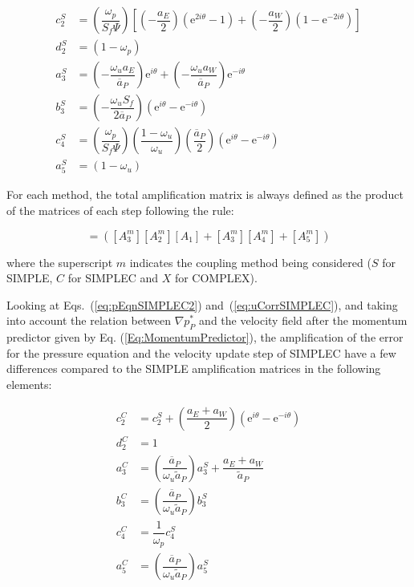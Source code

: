 \documentclass[final,3p,times,11pt,onecolumn]{myElsarticle}
\numberwithin{equation}{section}
\begin{document}
\begin{equation}
\begin{split}
     c^S_2 &= \left( \dfrac{\omega_p}{S_f \Psi} \right) 
                    \left[ \left(-\dfrac{a_E}{2} \right) \left(\text{e}^{2 i \theta} - 1 \right) +
                            \left(-\dfrac{a_W}{2} \right) \left(1 - \text{e}^{-2 i \theta}\right)
                    \right] \\
     d^S_2 &= (1-\omega_p) \\
     a^S_3 &= \left(-\dfrac{\omega_u a_E}{\overline{a}_P}\right) \text{e}^{i \theta} + \left(- \dfrac{\omega_u a_W}{\overline{a}_P}\right) \text{e}^{- i \theta} \\
     b^S_3 &= \left(-\dfrac{\omega_u S_f}{2 \overline{a}_P}\right) \left(\text{e}^{i \theta}-\text{e}^{-i \theta}\right) \\ 
     c^S_4 &= \left( \dfrac{\omega_p}{S_f \Psi} \right) 
                     \left(\dfrac{1-\omega_u}{\omega_u} \right) \left(\dfrac{\overline{a}_P}{2} \right) \left(\text{e}^{i \theta} - \text{e}^{- i \theta} \right)  \\
     a^S_5 &= (1-\omega_u)      
\end{split}
\end{equation}

For each method, the total amplification matrix is always defined as the product of the matrices of each step following the rule:

\begin{equation}
[A^m] = ([A^m_3] [A^m_2] [A_1] + [A^m_3] [A^m_4] + [A^m_5])
\end{equation}

\noindent where the superscript $m$ indicates the coupling method being considered ($S$ for SIMPLE, $C$ for SIMPLEC and $X$ for COMPLEX).

Looking at Eqs.~(\ref{eq:pEqnSIMPLEC2}) and~(\ref{eq:uCorrSIMPLEC}), and taking into account the relation between $\nabla p_P^*$ and the velocity field after the momentum predictor given by Eq. (\ref{Eq:MomentumPredictor}), the amplification of the error for the pressure equation and the velocity update step of SIMPLEC have a few differences compared to the SIMPLE amplification matrices in the following elements:

\begin{equation}
\begin{split}
     c^C_2 &= c_2^S + \left(\dfrac{a_E + a_W}{2}\right) (\text{e}^{i    \theta} - \text{e}^{-i \theta}) \\
     d^C_2 &= 1 \\
     a^C_3 &= \left(\dfrac{\overline{a}_P}{\omega_u \tilde{a}_P}\right) a_3^S + \dfrac{a_E+a_W}{\tilde{a}_P} \\
     b^C_3 &= \left(\dfrac{\overline{a}_P}{\omega_u \tilde{a}_P}\right) b_3^S \\ 
     c^C_4 &= \dfrac{1}{\omega_p} c^S_4 \\
     a^C_5 &= \left(\dfrac{\overline{a}_P}{\omega_u \tilde{a}_P}\right) a^S_5     
\end{split}
\end{equation}
\end{document}
